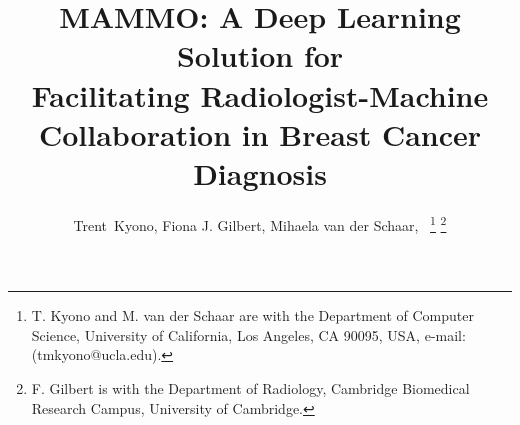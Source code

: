 \documentclass[journal]{IEEEtran}
\begin{document}
%
\title{MAMMO: A Deep Learning Solution for \\Facilitating Radiologist-Machine Collaboration in Breast Cancer Diagnosis}
%
%
%

\author{Trent~Kyono,
        Fiona J. Gilbert,
        Mihaela van der Schaar,~%
\thanks{T. Kyono and M. van der Schaar are with the Department
of Computer Science, University of California, Los Angeles, CA 90095, USA,
e-mail: (tmkyono@ucla.edu).}%
\thanks{F. Gilbert is with the Department of Radiology, Cambridge Biomedical Research Campus, University of Cambridge.}%
}%

% 
%
\end{document}
